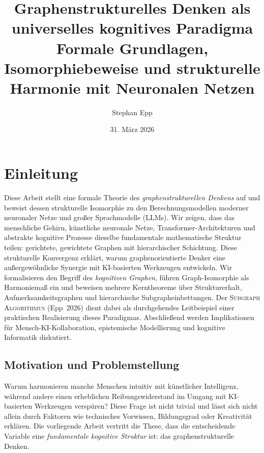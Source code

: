 ﻿\documentclass[12pt,a4paper]{article}
\title{\textbf{Graphenstrukturelles Denken als universelles kognitives Paradigma} \\ 
	\Large Formale Grundlagen, Isomorphiebeweise und strukturelle Harmonie mit Neuronalen Netzen}
\author{Stephan Epp}
\date{31. März 2026}
\theoremstyle{plain}
\theoremstyle{definition}
\theoremstyle{remark}
\newcommand{\SA}{\textnormal{\textsc{Subgraph Algorithmus}}}
\begin{document}
\maketitle
\tableofcontents
\newpage

\section{Einleitung}
\label{sec:einleitung}

Diese Arbeit stellt eine formale Theorie des \emph{graphenstrukturellen Denkens} auf und beweist dessen strukturelle Isomorphie zu den Berechnungsmodellen moderner neuronaler Netze und großer Sprachmodelle (LLMs). Wir zeigen, dass das menschliche Gehirn, künstliche neuronale Netze, Transformer-Architekturen und abstrakte kognitive Prozesse dieselbe fundamentale mathematische Struktur teilen: gerichtete, gewichtete Graphen mit hierarchischer Schichtung. Diese strukturelle Konvergenz erklärt, warum graphenorientierte Denker eine außergewöhnliche Synergie mit KI-basierten Werkzeugen entwickeln. Wir formalisieren den Begriff des \emph{kognitiven Graphen}, führen Graph-Isomorphie als Harmoniemaß ein und beweisen mehrere Kerntheoreme über Strukturerhalt, Aufmerksamkeitsgraphen und hierarchische Subgrapheinbettungen. Der \SA{} (Epp~2026) dient dabei als durchgehendes Leitbeispiel einer praktischen Realisierung dieses Paradigmas. Abschließend werden Implikationen für Mensch-KI-Kollaboration, epistemische Modellierung und kognitive Informatik diskutiert.

\subsection{Motivation und Problemstellung}

Warum harmonieren manche Menschen intuitiv mit künstlicher Intelligenz, während andere einen erheblichen Reibungswiderstand im Umgang mit KI-basierten Werkzeugen verspüren? Diese Frage ist nicht trivial und lässt sich nicht allein durch Faktoren wie technisches Vorwissen, Bildungsgrad oder Kreativität erklären. Die vorliegende Arbeit vertritt die These, dass die entscheidende Variable eine \emph{fundamentale kognitive Struktur} ist: das graphenstrukturelle Denken.
\end{document}
